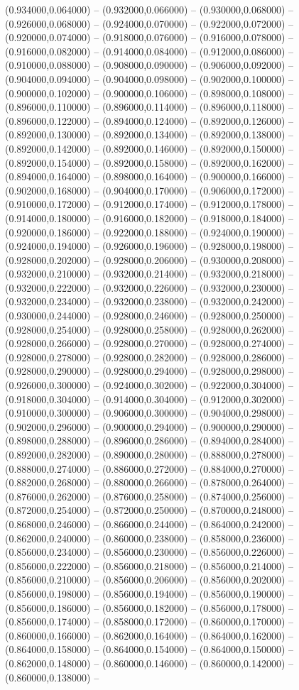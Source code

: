 (0.934000,0.064000) -- (0.932000,0.066000) -- (0.930000,0.068000) -- (0.926000,0.068000) -- (0.924000,0.070000) -- (0.922000,0.072000) -- (0.920000,0.074000) -- (0.918000,0.076000) -- (0.916000,0.078000) -- (0.916000,0.082000) -- (0.914000,0.084000) -- (0.912000,0.086000) -- (0.910000,0.088000) -- (0.908000,0.090000) -- (0.906000,0.092000) -- (0.904000,0.094000) -- (0.904000,0.098000) -- (0.902000,0.100000) -- (0.900000,0.102000) -- (0.900000,0.106000) -- (0.898000,0.108000) -- (0.896000,0.110000) -- (0.896000,0.114000) -- (0.896000,0.118000) -- (0.896000,0.122000) -- (0.894000,0.124000) -- (0.892000,0.126000) -- (0.892000,0.130000) -- (0.892000,0.134000) -- (0.892000,0.138000) -- (0.892000,0.142000) -- (0.892000,0.146000) -- (0.892000,0.150000) -- (0.892000,0.154000) -- (0.892000,0.158000) -- (0.892000,0.162000) -- (0.894000,0.164000) -- (0.898000,0.164000) -- (0.900000,0.166000) -- (0.902000,0.168000) -- (0.904000,0.170000) -- (0.906000,0.172000) -- (0.910000,0.172000) -- (0.912000,0.174000) -- (0.912000,0.178000) -- (0.914000,0.180000) -- (0.916000,0.182000) -- (0.918000,0.184000) -- (0.920000,0.186000) -- (0.922000,0.188000) -- (0.924000,0.190000) -- (0.924000,0.194000) -- (0.926000,0.196000) -- (0.928000,0.198000) -- (0.928000,0.202000) -- (0.928000,0.206000) -- (0.930000,0.208000) -- (0.932000,0.210000) -- (0.932000,0.214000) -- (0.932000,0.218000) -- (0.932000,0.222000) -- (0.932000,0.226000) -- (0.932000,0.230000) -- (0.932000,0.234000) -- (0.932000,0.238000) -- (0.932000,0.242000) -- (0.930000,0.244000) -- (0.928000,0.246000) -- (0.928000,0.250000) -- (0.928000,0.254000) -- (0.928000,0.258000) -- (0.928000,0.262000) -- (0.928000,0.266000) -- (0.928000,0.270000) -- (0.928000,0.274000) -- (0.928000,0.278000) -- (0.928000,0.282000) -- (0.928000,0.286000) -- (0.928000,0.290000) -- (0.928000,0.294000) -- (0.928000,0.298000) -- (0.926000,0.300000) -- (0.924000,0.302000) -- (0.922000,0.304000) -- (0.918000,0.304000) -- (0.914000,0.304000) -- (0.912000,0.302000) -- (0.910000,0.300000) -- (0.906000,0.300000) -- (0.904000,0.298000) -- (0.902000,0.296000) -- (0.900000,0.294000) -- (0.900000,0.290000) -- (0.898000,0.288000) -- (0.896000,0.286000) -- (0.894000,0.284000) -- (0.892000,0.282000) -- (0.890000,0.280000) -- (0.888000,0.278000) -- (0.888000,0.274000) -- (0.886000,0.272000) -- (0.884000,0.270000) -- (0.882000,0.268000) -- (0.880000,0.266000) -- (0.878000,0.264000) -- (0.876000,0.262000) -- (0.876000,0.258000) -- (0.874000,0.256000) -- (0.872000,0.254000) -- (0.872000,0.250000) -- (0.870000,0.248000) -- (0.868000,0.246000) -- (0.866000,0.244000) -- (0.864000,0.242000) -- (0.862000,0.240000) -- (0.860000,0.238000) -- (0.858000,0.236000) -- (0.856000,0.234000) -- (0.856000,0.230000) -- (0.856000,0.226000) -- (0.856000,0.222000) -- (0.856000,0.218000) -- (0.856000,0.214000) -- (0.856000,0.210000) -- (0.856000,0.206000) -- (0.856000,0.202000) -- (0.856000,0.198000) -- (0.856000,0.194000) -- (0.856000,0.190000) -- (0.856000,0.186000) -- (0.856000,0.182000) -- (0.856000,0.178000) -- (0.856000,0.174000) -- (0.858000,0.172000) -- (0.860000,0.170000) -- (0.860000,0.166000) -- (0.862000,0.164000) -- (0.864000,0.162000) -- (0.864000,0.158000) -- (0.864000,0.154000) -- (0.864000,0.150000) -- (0.862000,0.148000) -- (0.860000,0.146000) -- (0.860000,0.142000) -- (0.860000,0.138000) -- 